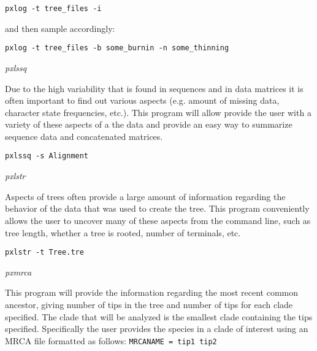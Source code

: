 \documentclass[12pt,letterpaper]{article}
\renewcommand{\subsection}[1]{%
\bigskip
\begin{center}
\begin{large}
\normalfont\itshape #1
\end{large}
\end{center}}
\begin{document}
\begin{flushleft}
\begin{verbatim}
pxlog -t tree_files -i
\end{verbatim}
\end{flushleft}
and then sample accordingly:
\begin{flushleft}
\begin{verbatim}
pxlog -t tree_files -b some_burnin -n some_thinning
\end{verbatim}
\end{flushleft}

\subsection{pxlssq}

Due to the high variability that is found in sequences and in data matrices it is often important to find out various aspects (e.g. amount of missing data, character state frequencies, etc.). This program will allow provide the user with a variety of these aspects of a the data and provide an easy way to summarize sequence data and concatenated matrices.

\begin{flushleft}
\begin{verbatim}
pxlssq -s Alignment
\end{verbatim}
\end{flushleft}

\subsection{pxlstr}

Aspects of trees often provide a large amount of information regarding the behavior of the data that was used to create the tree. This program conveniently allows the user to uncover many of these aspects from the command line, such as tree length, whether a tree is rooted, number of terminals, etc.

\begin{flushleft}
\begin{verbatim}
pxlstr -t Tree.tre
\end{verbatim}
\end{flushleft}

\subsection{pxmrca}

This program will provide the information regarding the most recent common ancestor, giving number of tips in the tree and number of tips for each clade specified. The clade that will be analyzed is the smallest clade containing the tips specified. Specifically the user provides the species in a clade of interest using an MRCA file formatted as follows:
\texttt{MRCANAME = tip1 tip2}
\end{document}
